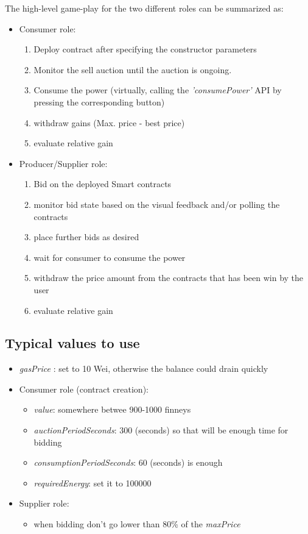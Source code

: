 \documentclass[a4paper]{article}
\begin{document}
The high-level game-play for the two different roles can be summarized as:
\begin{itemize}
    \item Consumer role:
    \begin{enumerate}
        \item Deploy contract after specifying the constructor parameters
        \item Monitor the sell auction until the auction is ongoing.
        \item Consume the power (virtually, calling the \emph{'consumePower'} API by pressing the corresponding button)
        \item withdraw gains (Max. price - best price)
        \item evaluate relative gain
    \end{enumerate}
    \item Producer/Supplier role:
    \begin{enumerate}
        \item Bid on the deployed Smart contracts
        \item monitor bid state based on the visual feedback and/or polling the contracts
        \item place further bids as desired
        \item wait for consumer to consume the power
        \item withdraw the price amount from the contracts that has been win by the user
        \item evaluate relative gain
    \end{enumerate}
\end{itemize}

\subsection{Typical values to use}
\begin{itemize}
    \item \emph{gasPrice} : set to 10 Wei, otherwise the balance could drain quickly
    \item Consumer role (contract creation):
    \begin{itemize}
        \item \emph{value}: somewhere betwee 900-1000 finneys
        \item \emph{auctionPeriodSeconds}: 300 (seconds) so that will be enough time for bidding
        \item \emph{consumptionPeriodSeconds}: 60 (seconds) is enough
        \item \emph{requiredEnergy}: set it to 100000
    \end{itemize}
    \item Supplier role:
    \begin{itemize}
        \item when bidding don't go lower than 80\% of the \emph{maxPrice}
    \end{itemize}
\end{itemize}
\end{document}
